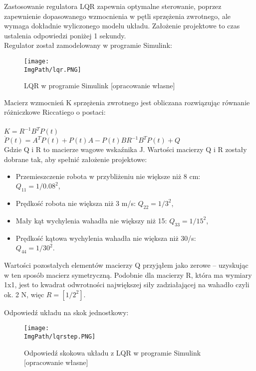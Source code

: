 \documentclass[a4paper,12pt,twoside,openany]{report}
\newcommand{\ImgPath}{.}
\begin{document}
Zastosowanie regulatora LQR zapewnia optymalne sterowanie, poprzez zapewnienie dopasowanego wzmocnienia w pętli sprzężenia zwrotnego, ale wymaga dokładnie wyliczonego modelu układu. Założenie projektowe to czas ustalenia odpowiedzi poniżej 1 sekundy.\\
Regulator został zamodelowany w programie Simulink:

\begin{figure}[!htbp]
	\begin{center}
\centering
\texttt{[image: \\ImgPath/lqr.PNG]}
\end{center}
	\caption{LQR w programie Simulink [opracowanie własne]}
	\label{schematKomunikacji}
\end{figure}

\newpage

\noindent Macierz wzmocnień K sprzężenia zwrotnego jest obliczana rozwiązując równanie różniczkowe Riccatiego o postaci:\\
\\
$K=R^{-1}B^TP(t)$\\
$\dot{P}(t)=A^TP(t)+P(t)A-P(t)BR^{-1}B^TP(t)+Q$\\

\noindent Gdzie Q i R to macierze wagowe wskaźnika J.
Wartości macierzy Q i R zostały dobrane tak, aby spełnić założenie projektowe:
\begin{itemize}
\item Przemieszczenie robota w przybliżeniu nie większe niż 8 cm: \\$Q_{11} = 1/0.08^2$,
\item Prędkość robota nie większa niż 3 m/s:					$Q_{22} = 1/3^2$,
\item Mały kąt wychylenia wahadła nie większy niż 15\textdegree :	$Q_{33} = 1/15^2$,
\item Prędkość kątowa wychylenia wahadła nie większa niż 30\textdegree/s:\\$Q_{44} = 1/30^2$.
\end{itemize}

Wartości pozostałych elementów macierzy Q przyjąłem jako zerowe – uzyskując w ten sposób macierz symetryczną.
Podobnie dla macierzy R, która ma wymiary 1x1, jest to kwadrat odwrotności największej siły zadziałającej na wahadło czyli ok. 2 N, więc $R = [1/2^2]$.\\

\newpage

\noindent Odpowiedź układu na skok jednostkowy:

\begin{figure}[!htbp]
	\begin{center}
\centering
\texttt{[image: \\ImgPath/lqrstep.PNG]}
\end{center}
	\caption{Odpowiedź skokowa układu z LQR w programie Simulink [opracowanie własne]}
	\label{schematKomunikacji}
\end{figure}
\end{document}
